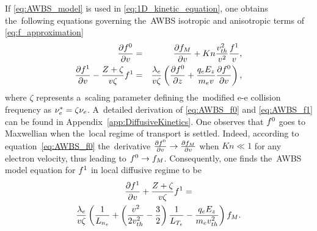 If \eqref{eq:AWBS_model} is used in \eqref{eq:1D_kinetic_equation}, one obtains
the~following equations governing the~AWBS isotropic and anisotropic terms of 
\eqref{eq:f_approximation}
\begin{eqnarray}
  \frac{\partial{f^0}}{\partial{v}} &=& \frac{\partial{f_M}}{\partial{v}}
  + Kn \frac{v_{th}^2}{v^2}\frac{f^1}{v} ,
  \label{eq:AWBS_f0} \\
  \frac{\partial{f^1}}{\partial{v}}  
  - \frac{Z + \zeta}{v\zeta} f^1 &=& \frac{\lambda_e}{v\zeta}
  \left(\frac{\partial{f^0}}{\partial{z}} + \frac{q_eE_z}{m_ev}\frac{\partial{f^0}}{\partial{v}}\right) ,
  \label{eq:AWBS_f1} 
\end{eqnarray}
where $\zeta$ represents a~scaling parameter defining the~modified
e-e collision frequency as $\nu_{e}^* = \zeta \nu_{e}$.
A~detailed derivation of \eqref{eq:AWBS_f0} and \eqref{eq:AWBS_f1} 
can be found in Appendix~\ref{app:DiffusiveKinetics}.
One observes that $f^0$ goes to Maxwellian when the~local regime of transport 
is settled. Indeed, according to equation~\eqref{eq:AWBS_f0} the~derivative 
$\frac{\partial{f^0}}{\partial{v}}\rightarrow\frac{\partial{f_M}}{\partial{v}}$  when $Kn\ll1$ for any 
electron velocity, thus leading to $f^0\rightarrow f_M$.
Consequently, one finds the~AWBS model equation for $f^1$ 
in local diffusive regime to be
\begin{multline}
  \frac{\partial{f^1}}{\partial{v}} + \frac{Z + \zeta}{v\zeta}f^1
  = \\
  \frac{\lambda_e}{v\zeta}\left(\frac{1}{L_{n_e}} + 
  \left( \frac{v^2}{2 v_{th}^2} - \frac{3}{2}\right)
  \frac{1}{L_{T_e}} - \frac{q_eE_z}{m_ev_{th}^2}\right)f_M .
  \label{eq:AWBS_f1_ODE}
\end{multline}

